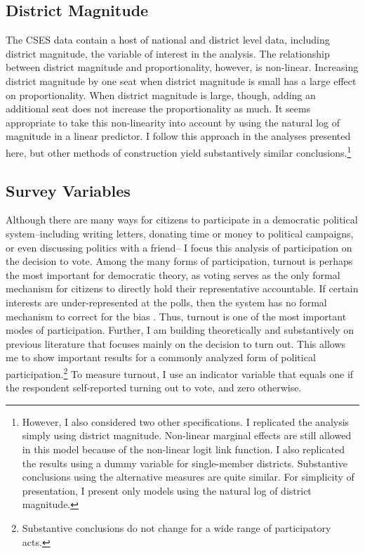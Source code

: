 \documentclass[12pt]{article}
\begin{document}
\subsection*{District Magnitude} 

The CSES data contain a host of national and district level data, including district magnitude, the variable of interest in the analysis. The relationship between district magnitude and proportionality, however, is non-linear. Increasing district magnitude by one seat when district magnitude is small has a large effect on proportionality. When district magnitude is large, though, adding an additional seat does not increase the proportionality as much. It seems appropriate to take this non-linearity into account by using the natural log of magnitude in a linear predictor. I follow this approach in the analyses presented here, but other methods of construction yield substantively similar conclusions.\footnote{However, I also considered two other specifications. I replicated the analysis simply using district magnitude. Non-linear marginal effects are still allowed in this model because of the non-linear logit link function. I also replicated the results using a dummy variable for single-member districts. Substantive conclusions using the alternative measures are quite similar. For simplicity of presentation, I present only models using the natural log of district magnitude.}

\subsection*{Survey Variables}

Although there are many ways for citizens to participate in a democratic political system--including writing letters, donating time or money to political campaigns, or even discussing politics with a friend-- I focus this analysis of participation on the decision to vote. Among the many forms of participation, turnout is perhaps the most important for democratic theory, as voting serves as the only formal mechanism for citizens to directly hold their representative accountable. If certain interests are under-represented at the polls, then the system has no formal mechanism to correct for the bias \citep{Lijphart1997, Lijphart1999}. Thus, turnout is one of the most important modes of participation. Further, I am building theoretically and substantively on previous literature that focuses mainly on the decision to turn out. This allows me to show important results for a commonly analyzed form of political participation.\footnote{Substantive conclusions do not change for a wide range of participatory acts.} To measure turnout, I use an indicator variable that equals one if the respondent self-reported turning out to vote, and zero otherwise.
\end{document}

